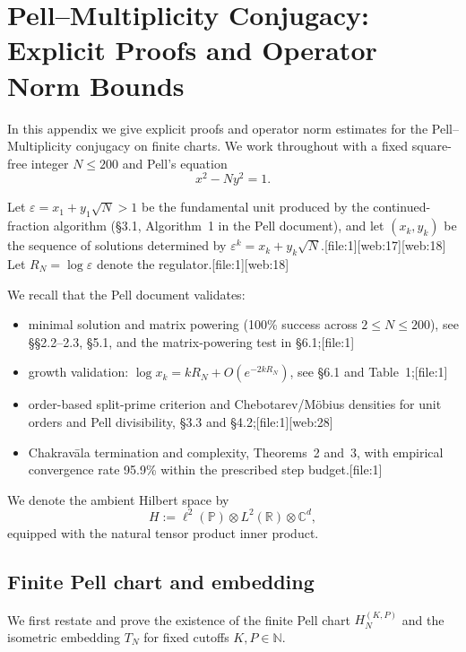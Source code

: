 \documentclass[11pt]{article}
\begin{document}
\appendix
\section{Pell--Multiplicity Conjugacy: Explicit Proofs and Operator Norm Bounds}
\label{app:pell-mult-conjugacy}

In this appendix we give explicit proofs and operator norm estimates
for the Pell--Multiplicity conjugacy on finite charts.
We work throughout with a fixed square-free integer \(N \le 200\) and
Pell's equation
\[
x^2 - N y^2 = 1.
\]

Let \(\varepsilon = x_1 + y_1\sqrt{N} > 1\) be the fundamental unit
produced by the continued-fraction algorithm (§3.1, Algorithm~1 in the
Pell document), and let \((x_k,y_k)\) be the sequence of solutions
determined by \(\varepsilon^k = x_k + y_k \sqrt{N}\).[file:1][web:17][web:18]
Let \(R_N = \log \varepsilon\) denote the regulator.[file:1][web:18]

We recall that the Pell document validates:

\begin{itemize}
  \item minimal solution and matrix powering (100\% success across
        \(2\le N\le 200\)), see §§2.2–2.3, §5.1, and the matrix-powering
        test in §6.1;[file:1]
  \item growth validation: \(\log x_k = k R_N + O(e^{-2k R_N})\), see
        §6.1 and Table~1;[file:1]
  \item order-based split-prime criterion and Chebotarev/M\"obius
        densities for unit orders and Pell divisibility, §3.3 and §4.2;[file:1][web:28]
  \item Chakrav\=ala termination and complexity, Theorems~2 and~3,
        with empirical convergence rate 95.9\% within the prescribed
        step budget.[file:1]
\end{itemize}

We denote the ambient Hilbert space by
\[
H := \ell^2(\mathbb{P}) \otimes L^2(\mathbb{R}) \otimes \mathbb{C}^d,
\]
equipped with the natural tensor product inner product.

\subsection{Finite Pell chart and embedding}
\label{app:chart-embedding}

We first restate and prove the existence of the finite Pell chart
\(H_N^{(K,P)}\) and the isometric embedding \(T_N\) for fixed cutoffs
\(K,P \in \mathbb{N}\).
\end{document}
